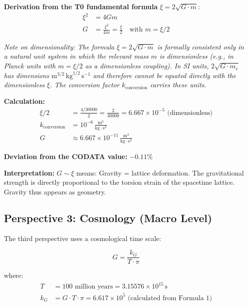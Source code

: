 	\textbf{Derivation from the T0 fundamental formula} \(\xi = 2\sqrt{G \cdot m}\):
	\begin{align}
		\xi^2 &= 4Gm \\
		G &= \frac{\xi^2}{4m} = \frac{\xi}{2} \quad \text{with } m = \xi/2
	\end{align}
	
	\textit{Note on dimensionality: The formula $\xi = 2\sqrt{G \cdot m}$ is formally consistent only in a natural unit system in which the relevant mass $m$ is dimensionless (e.g., in Planck units with $m = \xi/2$ as a dimensionless coupling). In SI units, $2\sqrt{G \cdot m_e}$ has dimensions $\text{m}^{3/2}\,\text{kg}^{1/2}\,\text{s}^{-1}$ and therefore cannot be equated directly with the dimensionless $\xi$. The conversion factor $k_{\text{conversion}}$ carries these units.}
	
	\textbf{Calculation:}
	\begin{align}
		\xi/2 &= \frac{4/30000}{2} = \frac{2}{30000} = 6.667 \times 10^{-5} \text{ (dimensionless)} \\
		k_{\text{conversion}} &= 10^{-6}\,\frac{\text{m}^3}{\text{kg} \cdot \text{s}^2} \\
		G &\approx 6.667 \times 10^{-11}\,\frac{\text{m}^3}{\text{kg} \cdot \text{s}^2}
	\end{align}
	
	\textbf{Deviation from the CODATA value:} \(-0.11\%\)
	
	\textbf{Interpretation:} \(G \sim \xi\) means: Gravity = lattice deformation. The gravitational strength is directly proportional to the torsion strain of the spacetime lattice. Gravity thus appears as geometry.
	
	\subsection{Perspective 3: Cosmology (Macro Level)}
	
	The third perspective uses a cosmological time scale:
	
	\begin{equation}
		\boxed{G = \frac{k_G}{T \cdot \pi}}
	\end{equation}
	
	where:
	\begin{align}
		T &= 100 \text{ million years} = 3.15576 \times 10^{15}\,\text{s} \\
		k_G &= G \cdot T \cdot \pi = 6.617 \times 10^5 \text{ (calculated from Formula 1)}
	\end{align}
	
